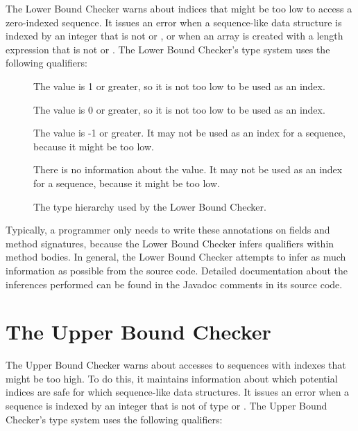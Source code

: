 The Lower Bound Checker warns about indices that might be
too low to access a zero-indexed sequence. It issues an error when
a sequence-like data structure is indexed by an integer that is not
 or ,
or when an array is created with a length expression that is not
 or .
The
Lower Bound Checker's type system uses the following qualifiers:

\begin{description}
\item[]
  The value is 1 or greater, so it is not too low to be used as an index.
\item[]
  The value is 0 or greater, so it is not too low to be used as an index.
\item[]
  The value is -1 or greater.
  It may not be used as an index for a sequence, because it might be too low.
\item[]
  There is no information about the value.
  It may not be used as an index for a sequence, because it might be too low.
\end{description}

\begin{figure}
  \caption{The type hierarchy used by the Lower Bound Checker.}
  \label{fig-lowerbound-types}
\end{figure}

Typically, a programmer only needs to write these annotations on
fields and method signatures, because the Lower Bound Checker infers
qualifiers within method bodies.
In general, the Lower Bound Checker attempts to infer as much information
as possible from the source code.
Detailed documentation about the inferences performed can be found
in the Javadoc comments in its source code.


\section{The Upper Bound Checker\label{index-upperbound}}

The Upper Bound Checker warns about accesses to sequences with indexes that might be
too high. To do this, it maintains information about which potential indices are safe
for which sequence-like data structures. It issues an error when a sequence 
is indexed by an integer that is not of type 
or .
The Upper Bound Checker's type system uses the following qualifiers:

